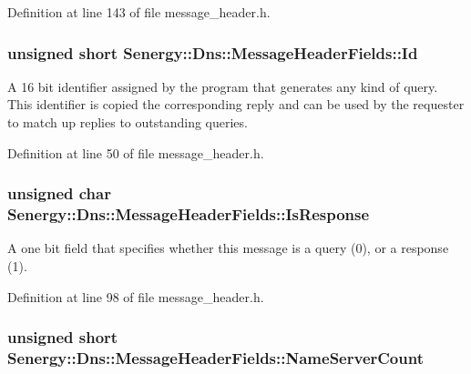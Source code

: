 Definition at line 143 of file message\-\_\-header.\-h.

\hypertarget{struct_senergy_1_1_dns_1_1_message_header_fields_ab423a1e91fecd6ad2ec36a4bdafd5c2b}{
\subsubsection[{Id}]{\setlength{\rightskip}{0pt plus 5cm}unsigned short Senergy\-::\-Dns\-::\-Message\-Header\-Fields\-::\-Id}}\label{struct_senergy_1_1_dns_1_1_message_header_fields_ab423a1e91fecd6ad2ec36a4bdafd5c2b}


A 16 bit identifier assigned by the program that generates any kind of query. This identifier is copied the corresponding reply and can be used by the requester to match up replies to outstanding queries. 



Definition at line 50 of file message\-\_\-header.\-h.

\hypertarget{struct_senergy_1_1_dns_1_1_message_header_fields_a0d0ac4fa85684c3d66a84e3392f3ef99}{
\subsubsection[{Is\-Response}]{\setlength{\rightskip}{0pt plus 5cm}unsigned char Senergy\-::\-Dns\-::\-Message\-Header\-Fields\-::\-Is\-Response}}\label{struct_senergy_1_1_dns_1_1_message_header_fields_a0d0ac4fa85684c3d66a84e3392f3ef99}


A one bit field that specifies whether this message is a query (0), or a response (1). 



Definition at line 98 of file message\-\_\-header.\-h.

\hypertarget{struct_senergy_1_1_dns_1_1_message_header_fields_a963b92841b3f7fc5fc9268c963d32d8d}{
\subsubsection[{Name\-Server\-Count}]{\setlength{\rightskip}{0pt plus 5cm}unsigned short Senergy\-::\-Dns\-::\-Message\-Header\-Fields\-::\-Name\-Server\-Count}}\label{struct_senergy_1_1_dns_1_1_message_header_fields_a963b92841b3f7fc5fc9268c963d32d8d}


